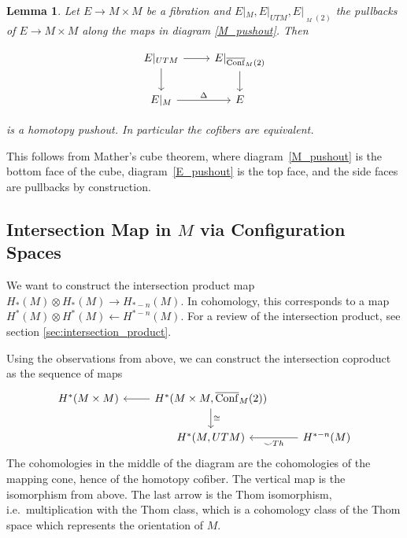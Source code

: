 \documentclass{scrartcl}
\theoremstyle{plain}
\newtheorem{lemma}[theorem]{Lemma}
\theoremstyle{definition}
\newcommand{\cupp}{\mathbin{\smile}}
\newcommand{\iso}{\cong}
\newcommand{\from}{\leftarrow}
\DeclareMathOperator{\cConf}{\overline{Conf}}
\begin{document}
\begin{lemma}\label{lemma_pullback_cube}
    Let $E\to M\times M$ be a fibration and $E|_M, E|_{UTM}, E|_{\cConf_M(2)}$ the pullbacks of $E\to M\times M$ along the maps in diagram \ref{M_pushout}. Then

    \begin{equation} \label{E_pushout}
    \begin{tikzcd}
        E|_{UTM} \dar\rar & E|_{\cConf_M(2)}\dar \\
        E|_{M} \rar["\Delta"] & E
    \end{tikzcd}
    \end{equation}
    
    is a homotopy pushout. In particular the cofibers are equivalent.    
\end{lemma}
This follows from Mather's cube theorem, where diagram~\ref{M_pushout} is the bottom face of the cube, diagram~\ref{E_pushout} is the top face, and the side faces are pullbacks by construction. %


\subsection{Intersection Map in $M$ via Configuration Spaces}\label{subsec:intersection-in-M-via-conf}

We want to construct the intersection product map $H_*(M) \otimes H_*(M) \to H_{*-n}(M)$. In cohomology, this corresponds to a map $H^*(M) \otimes H^*(M) \from H^{*-n}(M)$. For a review of the intersection product, see section \ref{sec:intersection_product}.

Using the observations from above, we can construct the intersection coproduct as the sequence of maps
\begin{equation}
\begin{tikzcd}
    H^*(M\times M) & \lar H^*(M\times M, \cConf_M(2)) \dar["\iso"] & \ \\
    & H^*(M, UTM)& \lar["\cupp Th"] H^{*-n}(M)
\end{tikzcd}
\end{equation}
The cohomologies in the middle of the diagram are the cohomologies of the mapping cone, hence of the homotopy cofiber. The vertical map is the isomorphism from above. The last arrow is the Thom isomorphism, i.e.\ multiplication with the Thom class, which is a cohomology class of the Thom space which represents the orientation of $M$. %
\end{document}
